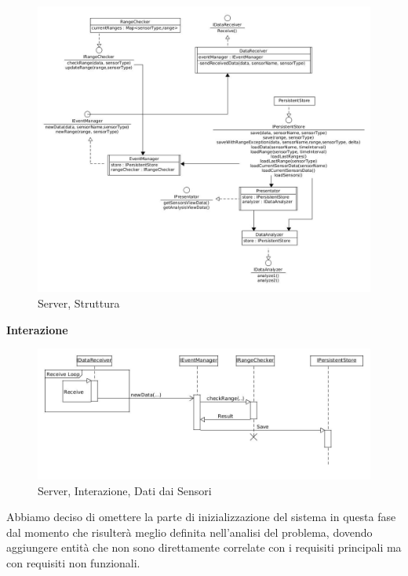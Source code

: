 \begin{figure}[ph]
\centering
\includegraphics[width=\textwidth,height=\textheight,keepaspectratio]{Figures/DomainModel/Server/Structure}
\caption{Server, Struttura}
\end{figure}

\afterpage{\clearpage}

\newpage

\begin{center}
\textbf{Interazione}
\end{center}

\begin{figure}[h]
\centering
\includegraphics[width=\textwidth]{Figures/DomainModel/Server/NewDataInteraction}
\caption{Server, Interazione, Dati dai Sensori}
\end{figure}

Abbiamo deciso di omettere la parte di inizializzazione del sistema in questa fase dal momento che risulter\`a meglio definita nell'analisi del problema, dovendo aggiungere entit\`a che non sono direttamente correlate con i requisiti principali ma con requisiti non funzionali.

